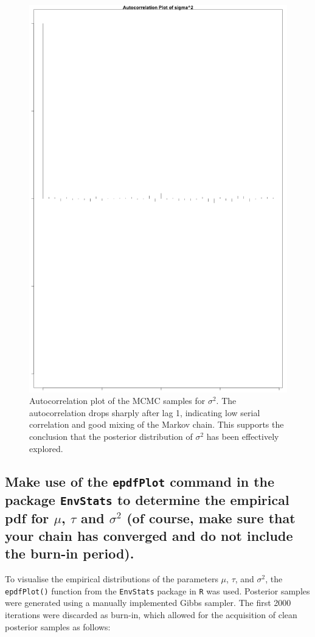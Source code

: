 \documentclass[]{article}
\begin{document}
\begin{figure}[H]
	\centering
	\includegraphics[width=0.7\linewidth]{img/img-autocorr-varpng}
    \caption{Autocorrelation plot of the MCMC samples for $\sigma^2$. The autocorrelation drops sharply after lag 1, indicating low serial correlation and good mixing of the Markov chain. This supports the conclusion that the posterior distribution of $\sigma^2$ has been effectively explored.}
	\label{fig:img-autocorr-varpng}
\end{figure}


\subsection{Make use of the \texttt{epdfPlot} command in the package \texttt{EnvStats} to determine the empirical pdf for $\mu$, $\tau$ and $\sigma^2$ (of course, make sure that your chain has converged and do not include the burn-in period).}


To visualise the empirical distributions of the parameters $\mu$, $\tau$, and $\sigma^2$, the \texttt{epdfPlot()} function from the \texttt{EnvStats} package in \texttt{R} was used. Posterior samples were generated using a manually implemented Gibbs sampler. The first 2000 iterations were discarded as burn-in, which allowed for the acquisition of clean posterior samples as follows:
\end{document}
